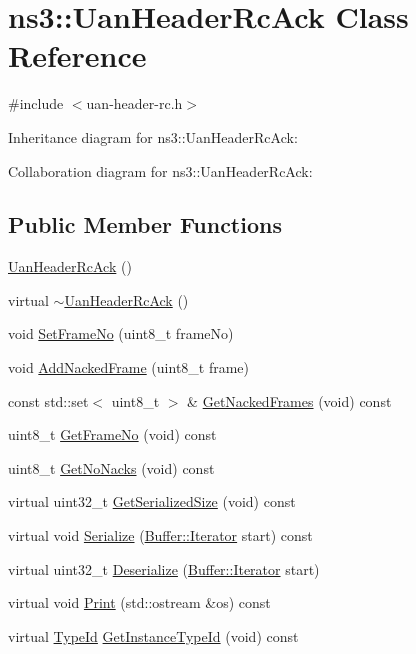 \hypertarget{classns3_1_1UanHeaderRcAck}{}\section{ns3\+:\+:Uan\+Header\+Rc\+Ack Class Reference}
\label{classns3_1_1UanHeaderRcAck}


{\ttfamily \#include $<$uan-\/header-\/rc.\+h$>$}



Inheritance diagram for ns3\+:\+:Uan\+Header\+Rc\+Ack\+:


Collaboration diagram for ns3\+:\+:Uan\+Header\+Rc\+Ack\+:
\subsection*{Public Member Functions}
\begin{DoxyCompactItemize}
\item 
\hyperlink{classns3_1_1UanHeaderRcAck_a957cb0d822250a1f9041c7377aae92d9}{Uan\+Header\+Rc\+Ack} ()
\item 
virtual \hyperlink{classns3_1_1UanHeaderRcAck_a9ead6fdb42b2eb4a3e1cf2ae19e2d2f1}{$\sim$\+Uan\+Header\+Rc\+Ack} ()
\item 
void \hyperlink{classns3_1_1UanHeaderRcAck_afda51d7faf8b52ade0876d6c76f851d1}{Set\+Frame\+No} (uint8\+\_\+t frame\+No)
\item 
void \hyperlink{classns3_1_1UanHeaderRcAck_ab6b608a1e27547209d5666a455e4a7f5}{Add\+Nacked\+Frame} (uint8\+\_\+t frame)
\item 
const std\+::set$<$ uint8\+\_\+t $>$ \& \hyperlink{classns3_1_1UanHeaderRcAck_a1f137cb36c88e96c87a4dac99e0fae8c}{Get\+Nacked\+Frames} (void) const 
\item 
uint8\+\_\+t \hyperlink{classns3_1_1UanHeaderRcAck_ad322d0a819e4f667096412d3dee0fb89}{Get\+Frame\+No} (void) const 
\item 
uint8\+\_\+t \hyperlink{classns3_1_1UanHeaderRcAck_a3f0a2e88e1d78259e5fb4859efcb32ba}{Get\+No\+Nacks} (void) const 
\item 
virtual uint32\+\_\+t \hyperlink{classns3_1_1UanHeaderRcAck_a2e1af0b2b606683b348238a37f087a09}{Get\+Serialized\+Size} (void) const 
\item 
virtual void \hyperlink{classns3_1_1UanHeaderRcAck_a0eb5608993114b39a5f5f2aa83dc6916}{Serialize} (\hyperlink{classns3_1_1Buffer_1_1Iterator}{Buffer\+::\+Iterator} start) const 
\item 
virtual uint32\+\_\+t \hyperlink{classns3_1_1UanHeaderRcAck_ac0280f6801f43e190bb37bdb58098e64}{Deserialize} (\hyperlink{classns3_1_1Buffer_1_1Iterator}{Buffer\+::\+Iterator} start)
\item 
virtual void \hyperlink{classns3_1_1UanHeaderRcAck_a423e3d2c913348b7cda2af304e715702}{Print} (std\+::ostream \&os) const 
\item 
virtual \hyperlink{classns3_1_1TypeId}{Type\+Id} \hyperlink{classns3_1_1UanHeaderRcAck_a128ff270647e51e57971af866feeb2d4}{Get\+Instance\+Type\+Id} (void) const 
\end{DoxyCompactItemize}
